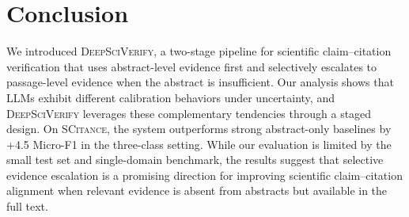 \documentclass{article}
\theoremstyle{plain}
\theoremstyle{definition}
\theoremstyle{remark}
\begin{document}


\section{Conclusion}


We introduced \textsc{DeepSciVerify}, a two-stage pipeline for scientific claim--citation verification that uses abstract-level evidence first and selectively escalates to passage-level evidence when the abstract is insufficient. Our analysis shows that LLMs exhibit different calibration behaviors under uncertainty, and \textsc{DeepSciVerify} leverages these complementary tendencies through a staged design. On \textsc{SCitance}, the system outperforms strong abstract-only baselines by +4.5 Micro-F1 in the three-class setting. While our evaluation is limited by the small test set and single-domain benchmark, the results suggest that selective evidence escalation is a promising direction for improving scientific claim--citation alignment when relevant evidence is absent from abstracts but available in the full text.
\end{document}
